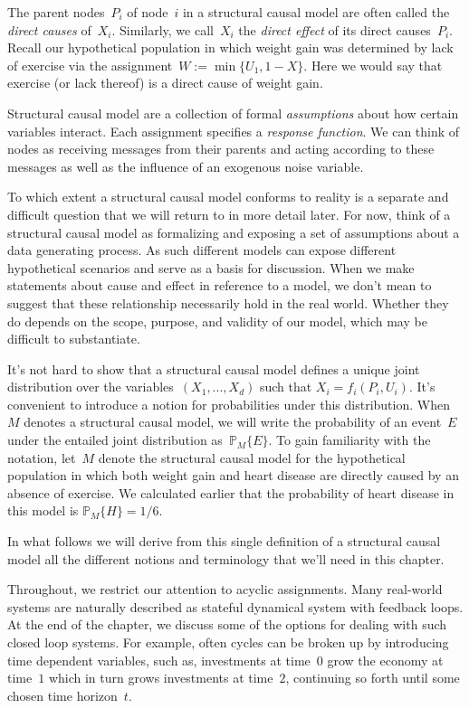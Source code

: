 \documentclass{tufte-book}
\begin{document}
The parent nodes~\(P_i\) of node~\(i\) in a structural causal model are
often called the \emph{direct causes} of~\(X_i.\)
Similarly, we call~\(X_i\) the \emph{direct effect}
of its direct causes~\(P_i.\) Recall our hypothetical population in
which weight gain was determined by lack of exercise via the
assignment~\(W:=\min\{U_1,1-X\}.\) Here we would say that exercise (or
lack thereof) is a direct cause of weight gain.

Structural causal model are a collection of formal \emph{assumptions}
about how certain variables interact. Each assignment specifies a
\emph{response function}. We can think of nodes as receiving messages
from their parents and acting according to these messages as well as the
influence of an exogenous noise variable.

To which extent a structural causal model conforms to reality is a
separate and difficult question that we will return to in more detail
later. For now, think of a structural causal model as formalizing and
exposing a set of assumptions about a data generating process. As such
different models can expose different hypothetical scenarios and serve
as a basis for discussion. When we make statements about cause and
effect in reference to a model, we don't mean to suggest that these
relationship necessarily hold in the real world. Whether they do depends
on the scope, purpose, and validity of our model, which may be difficult
to substantiate.

It's not hard to show that a structural causal model defines a unique
joint distribution over the variables~\((X_1,..., X_d)\) such that
\(X_i=f_i(P_i,U_i).\) It's convenient to introduce a notion for
probabilities under this distribution. When~\(M\) denotes a structural
causal model, we will write the probability of an event~\(E\) under the
entailed joint distribution as~\(\mathbb{P}_M\{E\}.\) To gain
familiarity with the notation, let~\(M\) denote the structural causal
model for the hypothetical population in which both weight gain and
heart disease are directly caused by an absence of exercise. We
calculated earlier that the probability of heart disease in this model
is \(\mathbb{P}_M\{H\}=1/6.\)

In what follows we will derive from this single definition of a
structural causal model all the different notions and terminology that
we'll need in this chapter.

Throughout, we restrict our attention to acyclic assignments. Many
real-world systems are naturally described as stateful dynamical system
with feedback loops. At the end of the chapter, we discuss some of the
options for dealing with such closed loop systems. For example, often
cycles can be broken up by introducing time dependent variables, such
as, investments at time~\(0\) grow the economy at time~\(1\) which in
turn grows investments at time~\(2\), continuing so forth until some
chosen time horizon~\(t\).
\end{document}

